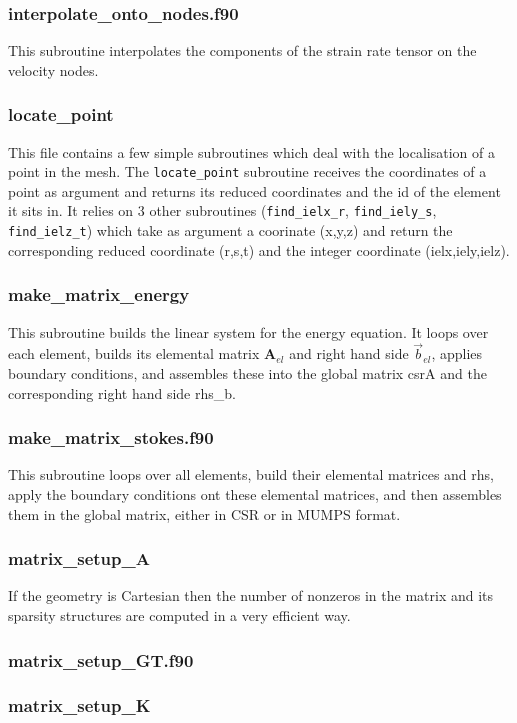  \subsubsection{interpolate\_onto\_nodes.f90}
 This subroutine interpolates the components of the strain rate tensor on the velocity nodes.
 \subsubsection{locate\_point}
 This file contains a few simple subroutines which deal with the localisation of a point 
 in the mesh. The {\tt locate\_point} subroutine receives the coordinates of a point as argument 
 and returns its reduced coordinates and the id of the element it sits in.
 It relies on 3 other subroutines ({\tt find\_ielx\_r}, {\tt find\_iely\_s}, {\tt find\_ielz\_t})
 which take as argument a coorinate (x,y,z) and return the corresponding reduced
 coordinate (r,s,t) and the integer coordinate (ielx,iely,ielz).
 \subsubsection{make\_matrix\_energy}
 This subroutine builds the linear system for the energy equation. 
 It loops over each element, builds its elemental matrix ${\bm A}_{el}$
 and right hand side $\vec{b}_{el}$, applies boundary conditions, 
 and assembles these into the global matrix csrA and the corresponding 
 right hand side rhs\_b. 
 \subsubsection{make\_matrix\_stokes.f90}
 This subroutine loops over all elements, build their elemental matrices and rhs, 
 apply the boundary conditions ont these elemental matrices, and then 
 assembles them in the global matrix, either in CSR or in MUMPS format.
 \subsubsection{matrix\_setup\_A}
 If the geometry is Cartesian then the number of nonzeros in the matrix and its sparsity 
 structures are computed in a very efficient way. 
 \subsubsection{matrix\_setup\_GT.f90}

 \subsubsection{matrix\_setup\_K}

